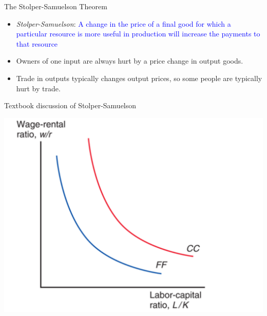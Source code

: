 \documentclass[ignorenonframetext,]{beamer}
\begin{document}
\begin{frame}{The Stolper-Samuelson Theorem}

    \begin{itemize}
            \item \emph{Stolper-Samuelson}: \textcolor{blue}{A change in the price of a final good for which a particular resource is more useful in production will increase the payments to that resource}
            \item Owners of one input are always hurt by a price change in output goods.
            \item Trade in outputs typically changes output prices, so some people are typically hurt by trade.
    \end{itemize}

\end{frame}

\begin{frame}{Textbook discussion of Stolper-Samuelson}

    \includegraphics[scale=0.2]{relative_input_prices.png}

\end{frame}
\end{document}
